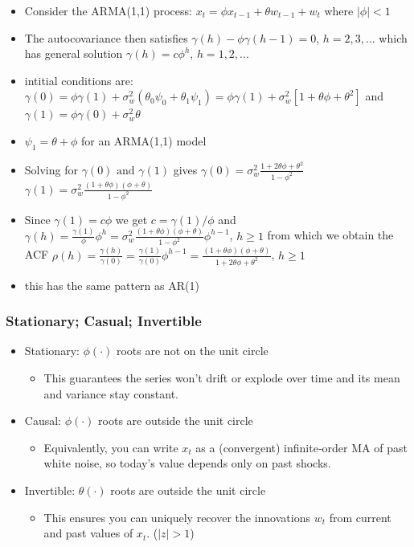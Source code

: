 \documentclass{article}
\begin{document}
\begin{itemize}
    \item Consider the ARMA(1,1) process: $x_t = \phi x_{t-1} + \theta w_{t-1} + w_t$ where $|\phi| < 1$
    \item The autocovariance then satisfies $\gamma(h) - \phi \gamma(h-1) = 0$, $h = 2,3,...$ which has general solution $\gamma(h) = c \phi^h$, $h = 1,2,...$
    \item intitial conditions are: $\gamma(0) = \phi \gamma(1) + \sigma^2 _w (\theta_0 \psi_0 + \theta_1 \psi_1) = \phi \gamma(1) + \sigma^2_w [1 + \theta\phi + \theta^2]$ and $\gamma(1) = \phi \gamma(0) + \sigma^2_w \theta$
    \item $\psi_1 = \theta + \phi$ for an ARMA(1,1) model
    \item Solving for $\gamma(0) \text{ and } \gamma(1)$ gives
    \subitem $\gamma(0) = \sigma^2_w \frac{1 + 2\theta \phi + \theta^2}{1 - \phi^2}$
    \subitem $\gamma(1) = \sigma^2_w \frac{(1+ \theta \phi)(\phi+\theta)}{1 - \phi^2}$
    \item Since $\gamma(1) = c\phi$ we get $c = \gamma(1) / \phi$ and $\gamma(h) = \frac{\gamma(1)}{\phi}\phi^h = \sigma^2_w \frac{(1 + \theta \phi)(\phi + \theta)}{1 -\phi^2} \phi^{h-1}$, $h \geq 1$ from which we obtain the ACF $\rho(h) = \frac{\gamma(h)}{\gamma(0)} = \frac{\gamma(1)}{\gamma(0)}\phi^{h-1} = \frac{(1 + \theta \phi)(\phi + \theta)}{1 + 2 \theta\phi + \theta^2}$, $h \geq 1$
    \item this has the same pattern as AR(1)
\end{itemize}


\subsubsection{Stationary; Casual; Invertible}

\begin{itemize}
    \item Stationary: $\phi(\cdot)$ roots are not on the unit circle
    \begin{itemize}
        \item This guarantees the series won’t drift or explode over time and its mean and variance stay constant.
    \end{itemize}
    \item Causal: $\phi(\cdot)$ roots are outside the unit circle
    \begin{itemize}
        \item Equivalently, you can write $x_t$ as a (convergent) infinite‐order MA of past white noise, so today’s value depends only on past shocks.
    \end{itemize}
    \item Invertible: $\theta(\cdot)$ roots are outside the unit circle
    \begin{itemize}
        \item This ensures you can uniquely recover the innovations $w_t$ from current and past values of $x_t$. ($|z| >1$)
    \end{itemize}
\end{itemize}
\end{document}
